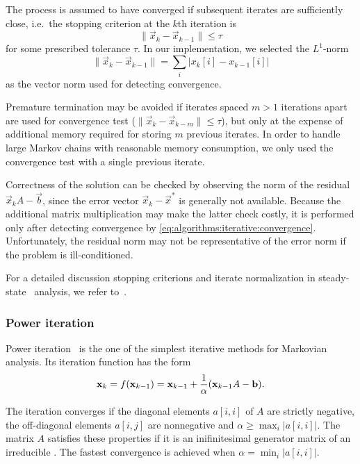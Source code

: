 The process is assumed to have converged if subsequent iterates are
sufficiently close, i.e.~the stopping criterion at the $k$th iteration
is
\begin{equation}
  \label{eq:algorithms:iterative:convergence}
  \| \vec{x}_{k} - \vec{x}_{k - 1} \| \le \tau
\end{equation}
for some prescribed tolerance $\tau$. In our implementation, we
selected the $L^1$-norm
\begin{equation}
  \| \vec{x}_{k} - \vec{x}_{k - 1} \| = \sum_{i} \bigl\lvert x_{k}[i] - x_{k -
    1}[i] \bigr\rvert
\end{equation}
as the vector norm used for detecting convergence.

Premature termination may be avoided if iterates spaced $m > 1$
iterations apart are used for convergence test
($\| \vec{x}_k - \vec{x}_{k - m} \| \le \tau$), but only at the
expense of additional memory required for storing $m$ previous
iterates. In order to handle large Markov chains with reasonable
memory consumption, we only used the convergence test with a single
previous iterate.

Correctness of the solution can be checked by observing the norm of
the residual $\vec{x}_{k} A - \vec{b}$, since the error vector
$\vec{x}_k - \vec{x}^*$ is generally not available. Because the
additional matrix multiplication may make the latter check costly, it
is performed only after detecting convergence by
\vref{eq:algorithms:iterative:convergence}. Unfortunately, the
residual norm may not be representative of the error norm if the
problem is ill-conditioned.

For a detailed discussion stopping criterions and iterate
normalization in steady-state \CTMC\ analysis, we refer
to~\citep[Section~10.3.5]{stewart2009probability}.

\subsubsection{Power iteration}
\label{ssec:algorithms:power}

Power iteration~\citep[Section~10.3.1]{stewart2009probability} is the
one of the simplest iterative methods for Markovian analysis. Its
iteration function has the form
\begin{equation}
  \vec{x}_k = f(\vec{x}_{k - 1}) = \vec{x}_{k - 1} + \frac{1}{\alpha} \mleft(
  \vec{x}_{k - 1} A - \vec{b} \mright) \text.
\end{equation}

The iteration converges if the diagonal elements $a[i,i]$ of $A$ are
strictly negative, the off-diagonal elements $a[i,j]$ are nonnegative
and $\alpha \ge \max_{i} \lvert a[i,i] \rvert$. The matrix $A$
satisfies these properties if it is an inifinitesimal generator matrix
of an irreducible \CTMC. The fastest convergence is achieved when
$\alpha = \min_{i} \lvert a[i,i] \rvert$.

